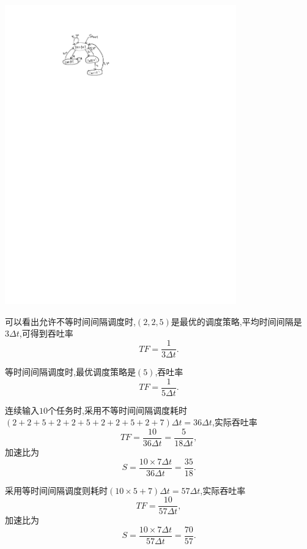 \documentclass[adobefonts, nocap]{ctexart}
\begin{document}
    \begin{center}
      \includegraphics[width=10cm]{3-crop.pdf}
    \end{center}

    可以看出允许不等时间间隔调度时,$(2,2,5)$是最优的调度策略,平均时间间隔是$3\Delta t$,可得到吞吐率
    \[
      TF=\frac{1}{3\Delta t}.
    \]

    等时间间隔调度时,最优调度策略是$(5)$,吞吐率
    \[
      TF=\frac{1}{5\Delta t}.
    \]

    连续输入$10$个任务时,采用不等时间间隔调度耗时$(2+2+5+2+2+5+2+2+5+2+7)\Delta t=36\Delta t$,实际吞吐率
    \[
      TF=\frac{10}{36\Delta t}=\frac{5}{18\Delta t},
    \]
    加速比为
    \[
      S=\frac{10\times 7\Delta t}{36\Delta t}=\frac{35}{18}.
    \]

    采用等时间间隔调度则耗时$(10\times 5+7)\Delta t=57\Delta t$,实际吞吐率
    \[
      TF=\frac{10}{57\Delta t},
    \]
    加速比为
    \[
      S=\frac{10\times 7\Delta t}{57\Delta t}=\frac{70}{57}.
    \]
\end{document}
